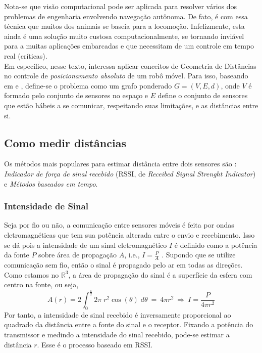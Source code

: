Nota-se que visão computacional pode ser aplicada para resolver vários dos problemas de engenharia envolvendo navegação autônoma. De fato, é com essa técnica que muitos dos animais se baseia para a locomoção. Infelizmente, esta ainda é uma solução muito custosa computacionalmente, se tornando inviável para a muitas aplicações embarcadas \cite{bayro2010geometric} e que necessitam de um controle em tempo real (críticas).
\\

Em específico, nesse texto, interessa aplicar conceitos de Geometria de Distâncias no controle de \textit{posicionamento absoluto} de um robô móvel. Para isso, baseando em \cite{eren2004rigidity} e \cite{savvides2001dynamic}, define-se o problema como um grafo ponderado $G = (V,E,d)$, onde $V$ é formado pelo conjunto de sensores no espaço e $E$ define o conjunto de sensores que estão hábeis a se comunicar, respeitando suas limitações, e as distâncias entre si.

\subsection{Como medir distâncias\label{sec:sensores}}

Os métodos mais populares para estimar distância entre dois sensores são \cite{savvides2001dynamic}: \textit{Indicador de força de sinal recebido} (RSSI, de \textit{Receibed Signal Strenght Indicator}) e \textit{Métodos baseados em tempo}.
\\

\subsubsection{Intensidade de Sinal}
Seja por fio ou não, a comunicação entre sensores móveis é feita por ondas eletromagnéticas que tem sua potência alterada entre o envio e recebimento. Isso se dá pois a intensidade de um sinal eletromagnético $I$ é definido como a potência da fonte $P$ sobre área de propagação $A$, i.e., $I = \frac{P}{A}$ \cite{moysesEletromag}. Supondo que se utilize comunicação sem fio, então o sinal é propagado pelo ar em todas as direções. Como estamos no $\mathbb{R}^3$, a área de propagação do sinal é a superfície da esfera com centro na fonte, ou seja, 
$$ A(r) = 2\int_0^{\frac{\pi}{2}} 2\pi\; r^2 \cos(\theta) \; d\theta \ = \ 4\pi r^2 \ \Rightarrow \ I = \frac{P}{4\pi r^2} $$
Por tanto, a intensidade de sinal recebido é inversamente proporcional ao quadrado da distância entre a fonte do sinal e o receptor. Fixando a potência do transmissor e medindo a intensidade do sinal recebido, pode-se estimar a distância $r$. Esse é o processo baseado em RSSI.
\\

